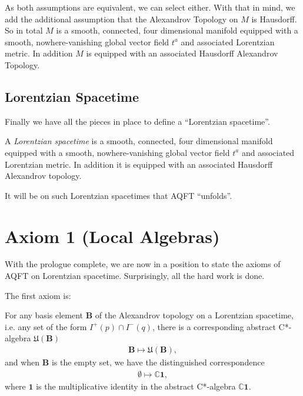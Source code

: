 As both assumptions are equivalent, we can select either. With that in mind, we add the additional assumption that the Alexandrov Topology on $M$ is Hausdorff. So in total $M$ is a smooth, connected, four dimensional manifold equipped with a smooth, nowhere-vanishing global vector field $t^a$ and associated Lorentzian metric. In addition $M$ is equipped with an associated Hausdorff Alexandrov Topology.

\subsection{Lorentzian Spacetime}
Finally we have all the pieces in place to define a ``Lorentzian spacetime''.

\begin{definition}
    A \textit{Lorentzian spacetime} is a smooth, connected, four dimensional manifold equipped with a smooth, nowhere-vanishing global vector field $t^a$ and associated Lorentzian metric. In addition it is equipped with an associated Hausdorff Alexandrov topology.
\end{definition}

It will be on such Lorentzian spacetimes that AQFT ``unfolds''.


\section{Axiom 1 (Local Algebras)}\label{sctn:axiom-1-(local-algebras)}
With the prologue complete, we are now in a position to state the axioms of AQFT on Lorentzian spacetime. Surprisingly, all the hard work is done.

The first axiom is:

\begin{axiom}
    For any basis element $\mathbf{B}$ of the Alexandrov topology on a Lorentzian spacetime, i.e. any set of the form $I^+(p) \cap I^-(q)$, there is a corresponding abstract C*-algebra $\mathfrak{U}(\mathbf{B})$
    \begin{align}
        \mathbf{B} \longmapsto \mathfrak{U}(\mathbf{B}),
    \end{align}
    and when $\mathbf{B}$ is the empty set, we have the distinguished correspondence
    \begin{align}
        \emptyset \longmapsto \mathbb{C} \mathbf{1},
    \end{align}
    where $\mathbf{1}$ is the multiplicative identity in the abstract C*-algebra $\mathbb{C} \mathbf{1}$.
\end{axiom}


